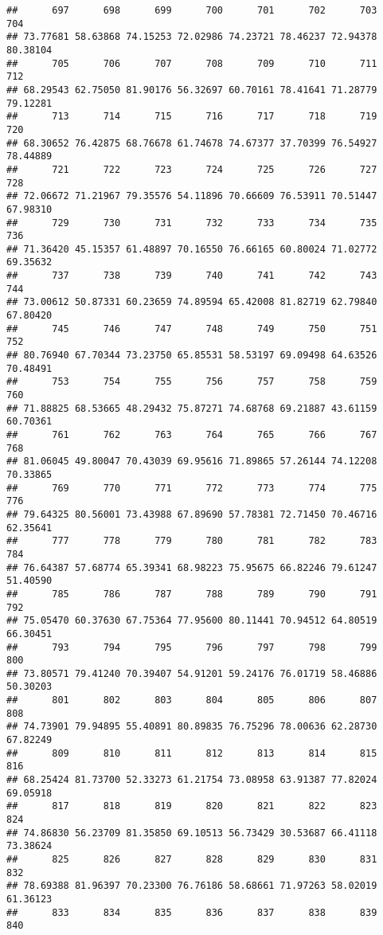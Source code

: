 \documentclass[
]{article}
\begin{document}
\begin{verbatim}
##      697      698      699      700      701      702      703      704 
## 73.77681 58.63868 74.15253 72.02986 74.23721 78.46237 72.94378 80.38104 
##      705      706      707      708      709      710      711      712 
## 68.29543 62.75050 81.90176 56.32697 60.70161 78.41641 71.28779 79.12281 
##      713      714      715      716      717      718      719      720 
## 68.30652 76.42875 68.76678 61.74678 74.67377 37.70399 76.54927 78.44889 
##      721      722      723      724      725      726      727      728 
## 72.06672 71.21967 79.35576 54.11896 70.66609 76.53911 70.51447 67.98310 
##      729      730      731      732      733      734      735      736 
## 71.36420 45.15357 61.48897 70.16550 76.66165 60.80024 71.02772 69.35632 
##      737      738      739      740      741      742      743      744 
## 73.00612 50.87331 60.23659 74.89594 65.42008 81.82719 62.79840 67.80420 
##      745      746      747      748      749      750      751      752 
## 80.76940 67.70344 73.23750 65.85531 58.53197 69.09498 64.63526 70.48491 
##      753      754      755      756      757      758      759      760 
## 71.88825 68.53665 48.29432 75.87271 74.68768 69.21887 43.61159 60.70361 
##      761      762      763      764      765      766      767      768 
## 81.06045 49.80047 70.43039 69.95616 71.89865 57.26144 74.12208 70.33865 
##      769      770      771      772      773      774      775      776 
## 79.64325 80.56001 73.43988 67.89690 57.78381 72.71450 70.46716 62.35641 
##      777      778      779      780      781      782      783      784 
## 76.64387 57.68774 65.39341 68.98223 75.95675 66.82246 79.61247 51.40590 
##      785      786      787      788      789      790      791      792 
## 75.05470 60.37630 67.75364 77.95600 80.11441 70.94512 64.80519 66.30451 
##      793      794      795      796      797      798      799      800 
## 73.80571 79.41240 70.39407 54.91201 59.24176 76.01719 58.46886 50.30203 
##      801      802      803      804      805      806      807      808 
## 74.73901 79.94895 55.40891 80.89835 76.75296 78.00636 62.28730 67.82249 
##      809      810      811      812      813      814      815      816 
## 68.25424 81.73700 52.33273 61.21754 73.08958 63.91387 77.82024 69.05918 
##      817      818      819      820      821      822      823      824 
## 74.86830 56.23709 81.35850 69.10513 56.73429 30.53687 66.41118 73.38624 
##      825      826      827      828      829      830      831      832 
## 78.69388 81.96397 70.23300 76.76186 58.68661 71.97263 58.02019 61.36123 
##      833      834      835      836      837      838      839      840 

\end{verbatim}
\end{document}
